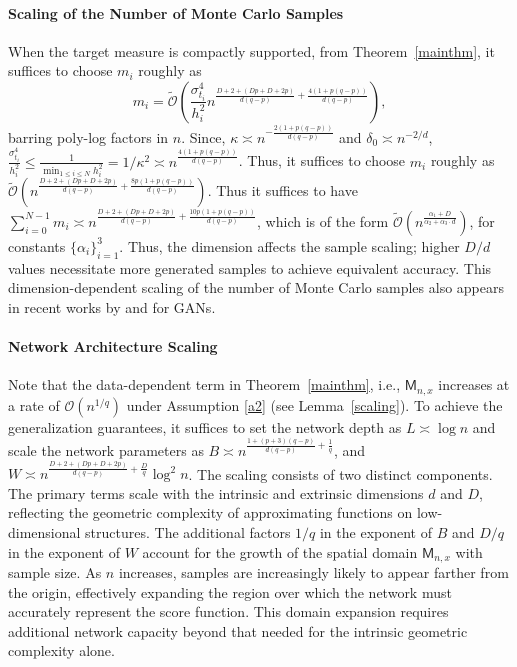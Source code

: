 \documentclass[12pts]{article}
\newcommand{\cO}{ \mathcal{O}}
\begin{document}
\paragraph{Scaling of the Number of Monte Carlo Samples} 
When the target measure is compactly supported, from Theorem~\ref{mainthm}, it suffices to choose $m_i$ roughly as \[m_i = \widetilde{\cO}\left(\frac{\sigma_{t_i}^4}{h_i^2} n^{\frac{D+2 + (Dp + D + 2p)}{d(q-p)} + \frac{4(1+p(q-p))}{d(q-p)}}\right),\] barring poly-log factors in $n$. Since, $\kappa \asymp n^{-\frac{2 (1+p(q-p))}{d(q-p)}} $ and $\delta_0 \asymp n^{-2/d}$, $\frac{\sigma_{t_i}^4}{h_i^2} \le \frac{1}{\min_{1 \le i \le N }h_i^2} = 1/\kappa^2 \asymp n^{\frac{4 (1+p(q-p))}{d(q-p)}}$. Thus, it suffices to choose $m_i$ roughly as $\widetilde{\cO}\left(n^{\frac{D+2 + (Dp + D + 2p)}{d(q-p)}  + \frac{8p(1+p(q-p))}{d(q-p)}}\right)$. Thus it suffices to have $\sum_{i=0}^{N-1} m_i \asymp  n^{\frac{D+2 + (Dp + D + 2p)}{d(q-p)}  + \frac{10p(1+p(q-p))}{d(q-p)}}$, which is of the form $\widetilde{\cO}\left(n^\frac{\alpha_1+D}{\alpha_2+ \alpha_3 \cdot d}\right)$, for constants $\{\alpha_i\}_{i=1}^3$. Thus, the dimension affects the sample scaling; higher $D/d$ values necessitate more generated samples to achieve equivalent accuracy. This dimension-dependent scaling of the number of Monte Carlo samples also appears in recent works by \citet{JMLR:v26:24-0054} and \citet{JMLR:v23:21-0732} for GANs.

\paragraph{Network Architecture Scaling} Note that the data-dependent term in Theorem~\ref{mainthm}, i.e., $\mathsf{M}_{n,x}$ increases at a rate of $\cO(n^{1/q})$ under Assumption \ref{a2} (see Lemma~\ref{scaling}). To achieve the generalization guarantees, it suffices to set the network depth as $L \asymp \log n$ and scale the network parameters as
$B \asymp n^{\frac{1+(p+3)(q-p)}{d(q-p)} + \frac{1}{q}}$, and $W \asymp  n^{\frac{D+2 + (Dp + D + 2p)}{d(q-p)} + \frac{D}{q}}
\log^2 n$. 
The scaling consists of two distinct components. The primary terms scale with the intrinsic and extrinsic dimensions $d$ and $D$, reflecting the geometric complexity of approximating functions on low-dimensional structures. The additional factors $1/q$ in the exponent of $B$ and $D/q$ in the exponent of $W$ account for the growth of the spatial domain $\mathsf{M}_{n,x}$ with sample size. As $n$ increases, samples are increasingly likely to appear farther from the origin, effectively expanding the region over which the network must accurately represent the score function. This domain expansion requires additional network capacity beyond that needed for the intrinsic geometric complexity alone.
\end{document}
